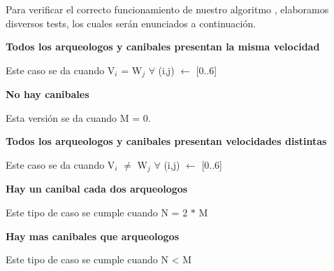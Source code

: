 \indent Para verificar el correcto funcionamiento de nuestro algoritmo , elaboramos disversos tests,
los cuales ser\'an enunciados a continuaci\'on.\\

\begin{center}
 \textbf{Todos los arqueologos y canibales presentan la misma velocidad}
\end{center}

Este caso se da cuando V$_{i}$ = W$_{j}$ $\forall$ (i,j)  $\gets$ [0..6] \\

 
 \begin{center}
 \textbf{No hay canibales}
\end{center}

Esta versi\'on se da cuando M = 0. 


\begin{center}
 \textbf{Todos los arqueologos y canibales presentan velocidades distintas}
\end{center}

Este caso se da cuando V$_{i}$ $\neq$ W$_{j}$ $\forall$ (i,j)  $\gets$ [0..6] 


\begin{center}
 \textbf{Hay un canibal cada dos arqueologos}
\end{center}

Este tipo de caso se cumple cuando N = 2 $\ast$ M


\begin{center}
 \textbf{Hay mas canibales que arqueologos}
\end{center}

Este tipo de caso se cumple cuando N < M

